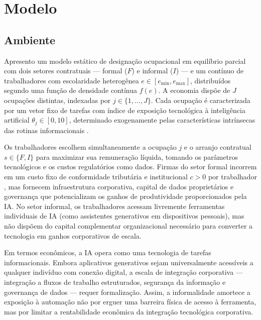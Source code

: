 \section{Modelo}
\label{sec:modelo}

\subsection{Ambiente}

Apresento um modelo estático de designação ocupacional em equilíbrio parcial com dois setores contratuais --- formal ($F$) e informal ($I$) --- e um contínuo de trabalhadores com escolaridade heterogênea $e \in [e_{\min}, e_{\max}]$, distribuídos segundo uma função de densidade contínua $f(e)$. A economia dispõe de $J$ ocupações distintas, indexadas por $j \in \{1, \dots, J\}$. Cada ocupação é caracterizada por um vetor fixo de tarefas com índice de exposição tecnológica à inteligência artificial $\theta_j \in [0, 10]$, determinado exogenamente pelas características intrínsecas das rotinas informacionais \citep{eloundou2024gpts}. 

Os trabalhadores escolhem simultaneamente a ocupação $j$ e o arranjo contratual $s \in \{F, I\}$ para maximizar sua remuneração líquida, tomando os parâmetros tecnológicos e os custos regulatórios como dados. Firmas do setor formal incorrem em um custo fixo de conformidade tributária e institucional $c > 0$ por trabalhador \citep{ulyssea2018firms}, mas fornecem infraestrutura corporativa, capital de dados proprietários e governança que potencializam os ganhos de produtividade proporcionados pela IA. No setor informal, os trabalhadores acessam livremente ferramentas individuais de IA (como assistentes generativos em dispositivos pessoais), mas não dispõem do capital complementar organizacional necessário para converter a tecnologia em ganhos corporativos de escala.

Em termos econômicos, a IA opera como uma tecnologia de tarefas informacionais. Embora aplicativos generativos sejam universalmente acessíveis a qualquer indivíduo com conexão digital, a escala de integração corporativa --- integração a fluxos de trabalho estruturados, segurança da informação e governança de dados --- requer formalização. Assim, a informalidade amortece a exposição à automação não por erguer uma barreira física de acesso à ferramenta, mas por limitar a rentabilidade econômica da integração tecnológica corporativa.

